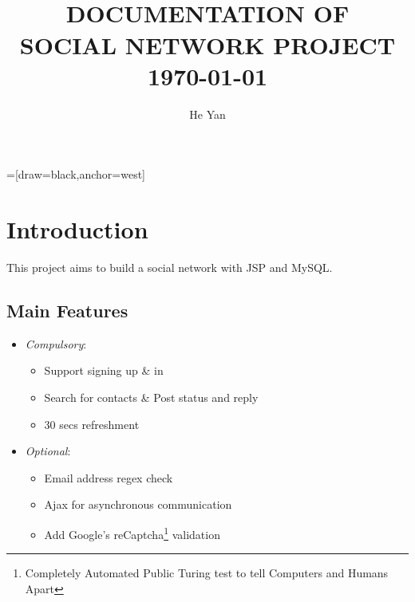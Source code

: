 


=[draw=black,anchor=west]
\title{
        \HRule{2pt}\\
        \LARGE \textbf{\uppercase{Documentation of\\ Social Network Project}}
        \HRule{2pt} \\ [0.5cm]
        \normalsize \today \vspace*{5\baselineskip}}

\date{}

\author{He Yan}

\maketitle
\tableofcontents
\setcounter{page}{0}
\thispagestyle{empty}
\newpage

\section{Introduction}

This project aims to build a social network with JSP and MySQL.

\subsection{Main Features}
\begin{itemize}
	\item \emph{Compulsory}:
		\begin{itemize}
			\item Support signing up \& in
			\item Search for contacts \& Post status and reply
			\item 30 secs refreshment
		\end{itemize}
	\item \emph{Optional}:
		\begin{itemize}
			\item Email address regex check
			\item Ajax for asynchronous communication
			\item Add Google's reCaptcha\footnote{Completely Automated Public Turing test to tell Computers and Humans Apart} validation
		\end{itemize}
\end{itemize}

